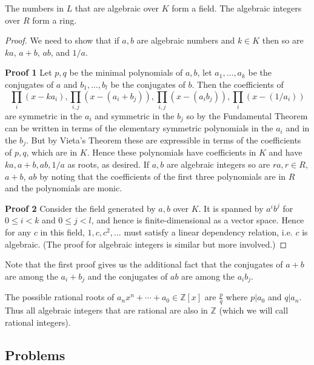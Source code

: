 \begin{thm}
The numbers in $L$ that are algebraic over $K$ form a field. The algebraic integers over $R$ form a ring.
\end{thm}
\begin{proof}
We need to show that if $a,b$ are algebraic numbers and $k\in K$ then so are $ka$, $a+b$, $ab$, and $1/a$. 

\noindent \textbf{Proof 1} Let $p,q$ be the minimal polynomials of $a,b$, let $a_1,\ldots, a_k$ be the conjugates of $a$ and $b_1,\ldots, b_l$ be the conjugates of $b$. Then the coefficients of
\[\prod_i (x-ka_i),\prod_{i,j} (x-(a_i+b_j)),\prod_{i,j} (x-(a_ib_j)),\prod_{i} (x-(1/a_i))\]
are symmetric in the $a_i$ and symmetric in the $b_j$ so by the Fundamental Theorem can be written in terms of the elementary symmetric polynomials in the $a_i$ and in the $b_j$. But by Vieta's Theorem these are expressible in terms of the coefficients of $p,q$, which are in $K$. Hence these polynomials have coefficients in $K$ and have $ka, a+b,ab,1/a$ as roots, as desired. If $a,b$ are algebraic integers so are $ra,r\in R$, $a+b$, $ab$ by noting that the coefficients of the first three polynomials are in $R$ and the polynomials are monic.

\noindent\textbf{Proof 2} Consider the field generated by $a,b$ over $K$. It is spanned by $a^ib^j$ for $0\leq i< k$ and $0\leq j< l$, and hence is finite-dimensional as a vector space. Hence for any $c$ in this field, $1,c,c^2,\ldots$ must satisfy a linear dependency relation, i.e. $c$ is algebraic. (The proof for algebraic integers is similar but more involved.)
\end{proof}
Note that the first proof gives us the additional fact that the conjugates of $a+b$ are among the $a_i+b_j$ and the conjugates of $ab$ are among the $a_ib_j$.

\begin{thm}
The possible rational roots of $a_nx^n+\cdots +a_0\in\mathbb Z[x]$ %
are $\frac{p}{q}$ where $p|a_0$ and $q|a_n$. Thus all algebraic integers that are rational are also in $\mathbb{Z}$ (which we will call rational integers).
\end{thm}

\subsection{Problems}


